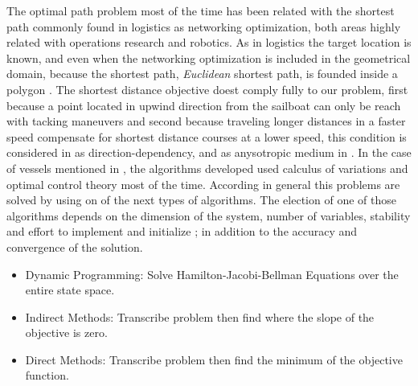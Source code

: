 The optimal path problem most of the time has been related with the shortest path commonly found in logistics as networking optimization, both areas highly related with operations research and robotics. As in logistics the target location is known, and even when the networking optimization is included in the geometrical domain, because the shortest path, \textit{Euclidean} shortest path, is founded inside a polygon \cite{mitchell2000geometric}. The shortest distance objective doest comply fully to our problem,  first because a point located in upwind direction from the sailboat can only be reach with tacking maneuvers and second because traveling longer distances in a faster speed  compensate for shortest distance courses at a lower speed, this condition is considered in \cite{dolinskaya2012optimal} as direction-dependency, and as anysotropic medium in \cite{dolinskaya2012path}. In the case of vessels mentioned in \cite{dolinskaya2013fastest}, the algorithms developed used calculus of variations and optimal control theory most of the time. According \cite{kelly2015transcription} in general this problems are solved by using on of the next types of algorithms.  The election of one of those algorithms depends on the dimension of the system, number of variables, stability and effort to implement and initialize \cite{kelly2015transcription}; in addition to the accuracy and convergence of the solution. \par 
 \begin{itemize}  
\item Dynamic Programming: Solve Hamilton-Jacobi-Bellman Equations over the entire state space.  
\item Indirect Methods: Transcribe problem then find where the slope of the objective is zero.
\item Direct Methods: Transcribe problem then find the minimum of the objective function. 
\end{itemize}

